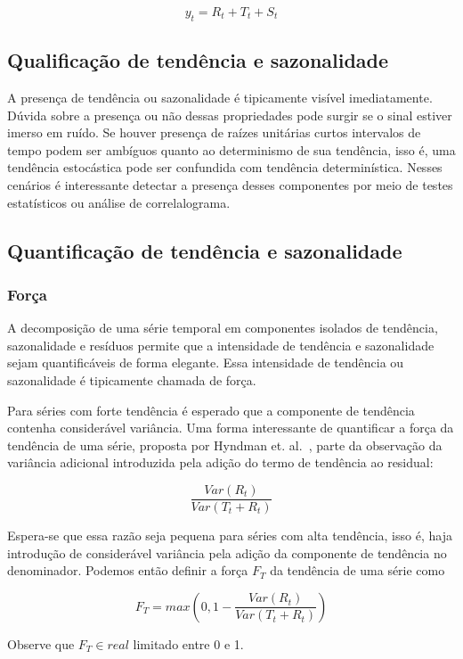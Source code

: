 $$ y_t = R_t + T_t + S_t $$

\subsection{Qualificação de tendência e sazonalidade}

A presença de tendência ou sazonalidade é tipicamente visível imediatamente.
Dúvida sobre a presença ou não dessas propriedades pode surgir se o sinal
estiver imerso em ruído. Se houver presença de raízes unitárias curtos
intervalos de tempo podem ser ambíguos quanto ao determinismo de sua tendência,
isso é, uma tendência estocástica pode ser confundida com tendência
determinística. Nesses cenários é interessante detectar a presença desses
componentes por meio de testes estatísticos ou análise de correlalograma.

\subsection{Quantificação de tendência e sazonalidade}

\subsubsection{Força}

A decomposição de uma série temporal em componentes isolados de tendência,
sazonalidade e resíduos permite que a intensidade de tendência e sazonalidade
sejam quantificáveis de forma elegante. Essa intensidade de tendência ou
sazonalidade é tipicamente chamada de força.

Para séries com forte tendência é esperado que a componente de tendência
contenha considerável variância. Uma forma interessante de quantificar a força
da tendência de uma série, proposta por Hyndman et. al.~\cite{athana}, parte
da observação da variância adicional introduzida pela adição do termo de
tendência ao residual:

$$ \frac{Var(R_t)}{Var(T_t + R_t)} $$

Espera-se que essa razão seja pequena para séries com alta tendência, isso é,
haja introdução de considerável variância pela adição da componente de
tendência no denominador. Podemos então definir a força $F_T$ da tendência de
uma série como

$$ F_T = max\left(0, 1 - \frac{Var(R_t)}{Var(T_t + R_t)}\right) $$

Observe que $F_T \in real$ limitado entre 0 e 1.

